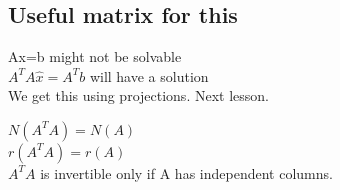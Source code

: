 \documentclass[]{article}
\begin{document}
\subsection{Useful matrix for this}

Ax=b might not be solvable \\

$A^TA\hat{x}=A^Tb$ will have a solution\\

We get this using projections. Next lesson.\\


\begin{mytheorem}[title=Important Notes]
$N(A^TA)=N(A)$\\
$r(A^TA)=r(A)$\\
$A^TA$ is invertible only if A has independent columns.
\end{mytheorem}
\end{document}
